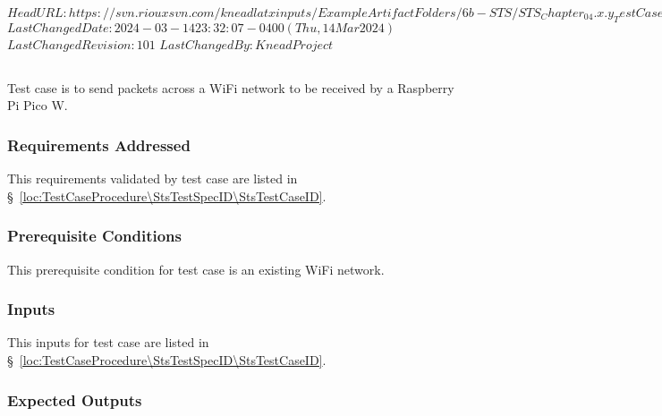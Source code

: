 \svnidlong
{$HeadURL: https://svn.riouxsvn.com/kneadlatxinputs/ExampleArtifactFolders/6b-STS/STS_Chapter_04.x.y_TestCaseBase.tex $}
{$LastChangedDate: 2024-03-14 23:32:07 -0400 (Thu, 14 Mar 2024) $}
{$LastChangedRevision: 101 $}
{$LastChangedBy: KneadProject $}

\subsection{\StsTestCaseID}
\label{loc:Test\StsTestCaseID}
% 

Test  case  is to send packets across a WiFi network to be received by a Raspberry Pi Pico W.

\subsubsection{Requirements Addressed}
\label{loc:TestCaseRequirementsAddressed\StsTestSpecID\StsTestCaseID}
% 

This requirements validated by test  case  are listed in \S~\ref{loc:TestCaseProcedure\StsTestSpecID\StsTestCaseID}.

\subsubsection{Prerequisite Conditions}
\label{loc:TestCasePrerequisiteConditions\StsTestSpecID\StsTestCaseID}
% 

This prerequisite condition for test  case  is an existing WiFi network.

\subsubsection{Inputs}
\label{loc:TestCaseInputs\StsTestSpecID\StsTestCaseID}
% 

This inputs for test  case  are listed in \S~\ref{loc:TestCaseProcedure\StsTestSpecID\StsTestCaseID}.

\subsubsection{Expected Outputs}
\label{loc:TestCaseExpectedOutputs\StsTestSpecID\StsTestCaseID}
% 

